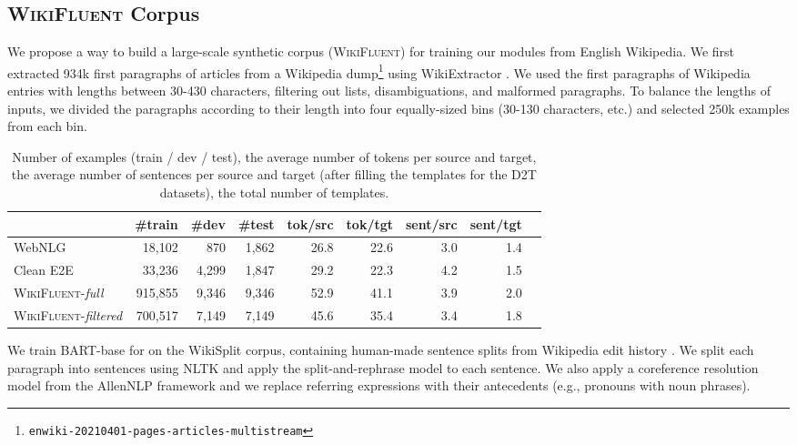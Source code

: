 \documentclass[12pt,notitlepage,a4paper,oneside,openany]{report}
\renewcommand\cite{\citep}
\begin{document}
\subsection{\textsc{WikiFluent} Corpus}
\label{sec:pipeline:wikifluent}
We propose a way to build a large-scale synthetic corpus (\textsc{WikiFluent}) for training our modules from English Wikipedia. We first extracted 934k first paragraphs of articles from a Wikipedia dump\footnote{\texttt{enwiki-20210401-pages-articles-multistream}} using WikiExtractor \cite{Wikiextractor2015}. We used the first paragraphs of Wikipedia entries with lengths between 30-430 characters, filtering out lists, disambiguations, and malformed paragraphs. To balance the lengths of inputs, we divided the paragraphs according to their length into four equally-sized bins (30-130 characters, etc.) and selected 250k examples from each bin.

\begin{table}[t]
    \centering
    \footnotesize
    \begin{tabular}{l rrrrrrrr}\toprule
                                              & \bf  \#train & \bf \#dev & \bf \#test & \bf tok/src & \bf tok/tgt & \bf sent/src & \bf sent/tgt \\  \midrule
        WebNLG                                & 18,102       & 870       & 1,862      & 26.8        & 22.6        & 3.0          & 1.4          \\
        Clean E2E                             & 33,236       & 4,299     & 1,847      & 29.2        & 22.3        & 4.2          & 1.5          \\ \midrule
        \textsc{WikiFluent}-\textit{full}     & 915,855      & 9,346     & 9,346      & 52.9        & 41.1        & 3.9          & 2.0          \\
        \textsc{WikiFluent}-\textit{filtered} & 700,517      & 7,149     & 7,149      & 45.6        & 35.4        & 3.4          & 1.8          \\ \bottomrule
    \end{tabular}
    \caption[Statistics of \textsc{WikiFluent} and data-to-text datasets.]{Number of examples (train / dev / test), the average number of tokens per source and target, the average number of sentences per source and target (after filling the templates for the D2T datasets), the total number of templates.}
    \label{tab:pipeline:wikifluent}
\end{table}

We train BART-base \cite{lewisBARTDenoisingSequencetoSequence2019} for \citep{narayan-etal-2017-split} on the WikiSplit corpus, containing human-made sentence splits from Wikipedia edit history \cite{botha-etal-2018-learning}.  We split each paragraph into sentences using NLTK \cite{bird2006nltk} and apply the split-and-rephrase model to each sentence. We also apply a coreference resolution model \cite{Lee2018HigherorderCR} from the AllenNLP framework \cite{gardner2018allennlp} and we replace referring expressions with their antecedents (e.g., pronouns with noun phrases).
\end{document}
